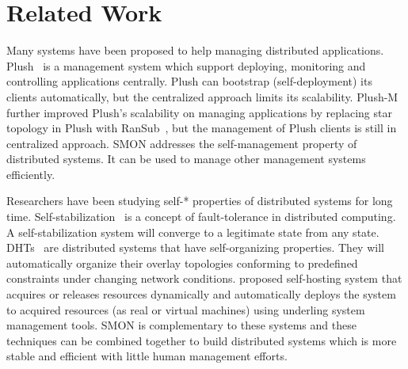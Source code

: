 \section{Related Work}
\label{sec:related}

Many systems have been proposed to help managing distributed
applications. Plush~\cite{Albrecht2007} is a management system
which support deploying, monitoring and controlling
applications centrally. Plush can bootstrap
(self-deployment) its clients automatically, but the
centralized approach limits its scalability. Plush-M~\cite{Topilski2008} further
improved Plush's scalability on managing applications by
replacing star topology in Plush with RanSub~\cite{Kostic2003}, but the
management of Plush clients is still in centralized
approach. SMON addresses the self-management property of
distributed systems. It can be used to manage other
management systems efficiently.

Researchers have been studying self-* properties of
distributed systems for long time.
Self-stabilization~\cite{Dijkstra1974} is a
concept of fault-tolerance in distributed computing. A
self-stabilization system will converge to a legitimate
state from any state. DHTs~\cite{Stoica2001, Ratnasamy2001, Rowstron2001}
are distributed systems
that have self-organizing properties. They will automatically
organize their overlay topologies conforming to predefined
constraints under changing network conditions.
\cite{Yin2008} proposed self-hosting system that acquires
or releases resources dynamically and automatically deploys
the system to acquired resources (as real or virtual
machines) using underling system management tools. SMON is
complementary to these systems and these techniques can be
combined together to build distributed systems which is more
stable and efficient with little human management efforts.




